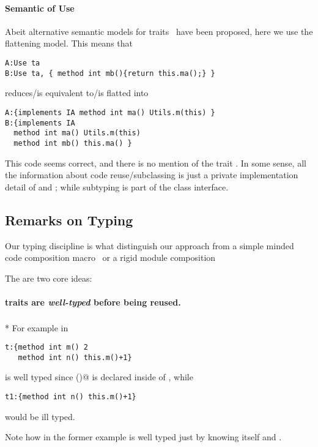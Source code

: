 \paragraph*{Semantic of Use}
Abeit alternative semantic models for traits~\cite{} have been proposed,
here we use the flattening model.
This means that 
\begin{lstlisting}
A:Use ta
B:Use ta, { method int mb(){return this.ma();} }
\end{lstlisting}
 
  reduces/is equivalent to/is flatted into
  
 \begin{lstlisting}
A:{implements IA method int ma() Utils.m(this) }
B:{implements IA
  method int ma() Utils.m(this)
  method int mb() this.ma() } 

 \end{lstlisting}
 
This code seems correct, and there is no mention of the trait \Q@ta@. In some sense, all the information about code reuse/subclassing is just a private implementation detail of \Q@A@ and \Q@B@; while subtyping is part of the class interface.

\subsection{Remarks on Typing}
Our typing discipline is 
what distinguish our approach from a simple minded code composition macro~\cite{bawden1999quasiquotation}
or a rigid module composition~\cite{ancona2002calculus}

The are two core ideas:
\paragraph*{traits are \emph{well-typed} before being reused.}${}_{}$\\*
 For example in

\begin{lstlisting}
t:{method int m() 2 
   method int n() this.m()+1}
\end{lstlisting}

\noindent \Q@t@ is well typed since \Q@m()@ is declared inside of \Q@t@, while

\begin{lstlisting}
t1:{method int n() this.m()+1} 
\end{lstlisting}
\noindent would be ill typed.

\noindent Note how in the former example \Q@ta@ is well typed just by knowing itself and \Q@IA@.


